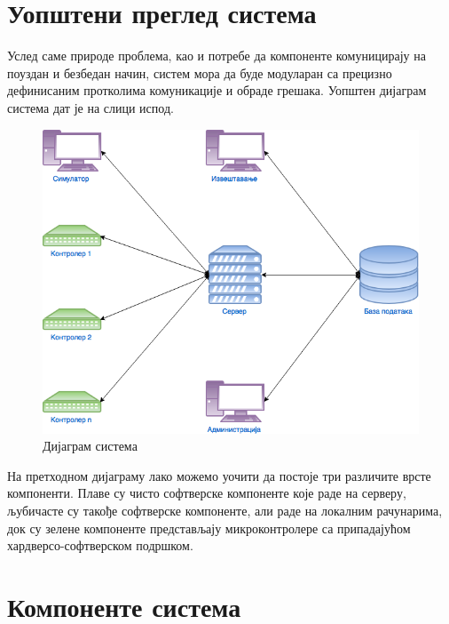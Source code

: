 \documentclass[a4paper, 12pt, diplomski]{etfcyr}
\begin{document}
        \section{Уопштени преглед система}
            \begin{justify}
                Услед саме природе проблема, као и потребе да компоненте комуницирају на поуздан и безбедан начин, систем мора да буде модуларан са прецизно дефинисаним протколима комуникације и обраде грешака. Уопштен дијаграм система дат је на слици испод.\newline
                
                \begin{figure}[h]
                    \begin{center}
                        \includegraphics[scale=0.45]{SystemOverview.png}
                    \end{center}
                    \caption{Дијаграм система}
                \end{figure}
                
                На претходном дијаграму лако можемо уочити да постоје три различите врсте компоненти. Плаве су чисто софтверске компоненте које раде на серверу, љубичасте су такође софтверске компоненте, али раде на локалним рачунарима, док су зелене компоненте представљају микроконтролере са припадајућом хардверсо-софтверском подршком.
            \end{justify}
         
         \section{Компоненте система}
             
\end{document}
